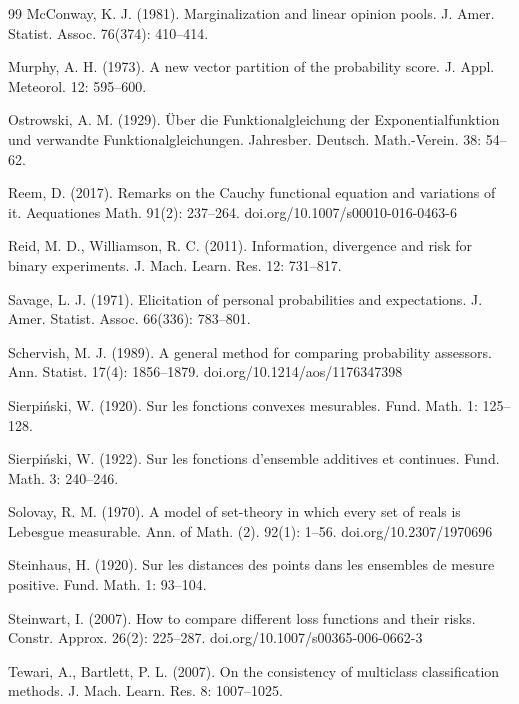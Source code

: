 \documentclass{article}
\theoremstyle{plain}
\theoremstyle{definition}
\begin{document}
\begin{thebibliography}{99}
McConway, K. J. (1981). Marginalization and linear opinion pools. J. Amer.
Statist. Assoc. 76(374): 410--414.

Murphy, A. H. (1973). A new vector partition of the probability score. J.
Appl. Meteorol. 12: 595--600.

Ostrowski, A. M. (1929). \"Uber die Funktionalgleichung der
Exponentialfunktion und verwandte Funktionalgleichungen. Jahresber. Deutsch.
Math.-Verein. 38: 54--62.

Reem, D. (2017). Remarks on the Cauchy functional equation and variations of
it. Aequationes Math. 91(2): 237--264. doi.org/10.1007/s00010-016-0463-6

Reid, M. D., Williamson, R. C. (2011). Information, divergence and risk for
binary experiments. J. Mach. Learn. Res. 12: 731--817.

Savage, L. J. (1971). Elicitation of personal probabilities and expectations.
J. Amer. Statist. Assoc. 66(336): 783--801.

Schervish, M. J. (1989). A general method for comparing probability
assessors. Ann. Statist. 17(4): 1856--1879. doi.org/10.1214/aos/1176347398

Sierpi\'nski, W. (1920). Sur les fonctions convexes mesurables. Fund. Math.
1: 125--128.

Sierpi\'nski, W. (1922). Sur les fonctions d'ensemble additives et continues.
Fund. Math. 3: 240--246.

Solovay, R. M. (1970). A model of set-theory in which every set of reals is
Lebesgue measurable. Ann. of Math. (2). 92(1): 1--56. doi.org/10.2307/1970696

Steinhaus, H. (1920). Sur les distances des points dans les ensembles de
mesure positive. Fund. Math. 1: 93--104.

Steinwart, I. (2007). How to compare different loss functions and their
risks. Constr. Approx. 26(2): 225--287. doi.org/10.1007/s00365-006-0662-3

Tewari, A., Bartlett, P. L. (2007). On the consistency of multiclass
classification methods. J. Mach. Learn. Res. 8: 1007--1025.


\end{thebibliography}
\end{document}
